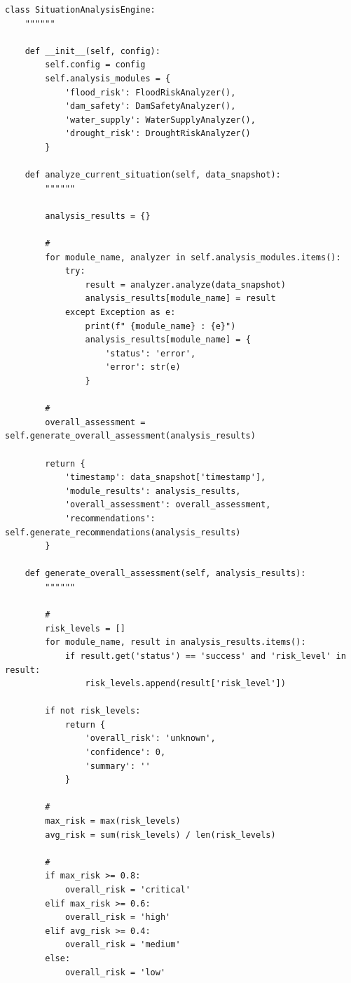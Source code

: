 \begin{lstlisting}[style=python]
class SituationAnalysisEngine:
    """"""
    
    def __init__(self, config):
        self.config = config
        self.analysis_modules = {
            'flood_risk': FloodRiskAnalyzer(),
            'dam_safety': DamSafetyAnalyzer(), 
            'water_supply': WaterSupplyAnalyzer(),
            'drought_risk': DroughtRiskAnalyzer()
        }
        
    def analyze_current_situation(self, data_snapshot):
        """"""
        
        analysis_results = {}
        
        # 
        for module_name, analyzer in self.analysis_modules.items():
            try:
                result = analyzer.analyze(data_snapshot)
                analysis_results[module_name] = result
            except Exception as e:
                print(f" {module_name} : {e}")
                analysis_results[module_name] = {
                    'status': 'error',
                    'error': str(e)
                }
        
        # 
        overall_assessment = self.generate_overall_assessment(analysis_results)
        
        return {
            'timestamp': data_snapshot['timestamp'],
            'module_results': analysis_results,
            'overall_assessment': overall_assessment,
            'recommendations': self.generate_recommendations(analysis_results)
        }
    
    def generate_overall_assessment(self, analysis_results):
        """"""
        
        # 
        risk_levels = []
        for module_name, result in analysis_results.items():
            if result.get('status') == 'success' and 'risk_level' in result:
                risk_levels.append(result['risk_level'])
        
        if not risk_levels:
            return {
                'overall_risk': 'unknown',
                'confidence': 0,
                'summary': ''
            }
        
        # 
        max_risk = max(risk_levels)
        avg_risk = sum(risk_levels) / len(risk_levels)
        
        # 
        if max_risk >= 0.8:
            overall_risk = 'critical'
        elif max_risk >= 0.6:
            overall_risk = 'high'
        elif avg_risk >= 0.4:
            overall_risk = 'medium'
        else:
            overall_risk = 'low'
        

\end{lstlisting}

